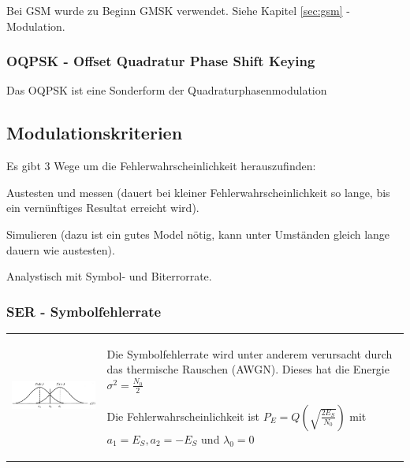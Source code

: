 Bei GSM wurde zu Beginn GMSK verwendet. Siehe Kapitel \ref{sec:gsm} - Modulation.
        

\subsubsection{OQPSK - Offset Quadratur Phase Shift Keying }
Das OQPSK ist eine Sonderform der Quadraturphasenmodulation
	
	
\subsection{Modulationskriterien}
Es gibt 3 Wege um die Fehlerwahrscheinlichkeit
herauszufinden:
\begin{liste}
	\item Austesten und messen (dauert bei kleiner Fehlerwahrscheinlichkeit so
	lange, bis ein vernünftiges Resultat erreicht wird).
	\item Simulieren (dazu ist ein gutes Model nötig, kann unter Umständen gleich
	lange dauern wie austesten).
	\item Analystisch mit Symbol- und Biterrorrate.
\end{liste}
\subsubsection{SER - Symbolfehlerrate }
\begin{tabular}{ll}
\parbox{8cm}{
    \includegraphics[width=8cm]{./bilder/modulation_AWGN.jpg}
    }
& \parbox{9cm}{
	Die Symbolfehlerrate wird unter anderem verursacht durch das thermische
	Rauschen (AWGN). Dieses hat die Energie\\ 
	$\sigma^2=\frac{N_0}{2}$ \\
	\\
	Die Fehlerwahrscheinlichkeit ist $P_E=Q(\sqrt{\frac{2 E_S}{N_0}})$ mit $a_1 =
	E_S, a_2 = -E_S$ und $\lambda_0 = 0$\\
    }
\end{tabular}

